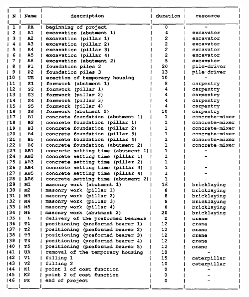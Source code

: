 \documentclass[dvipsnames,aspectratio=169]{beamer}
\begin{document}
\begin{frame}
\begin{columns}
\begin{column}{0.6\textwidth}
\end{column}
\begin{column}{0.4\textwidth}
\includegraphics[width=\textwidth]{images/bridge}

\end{column}
\end{columns}

\end{frame}
\end{document}
